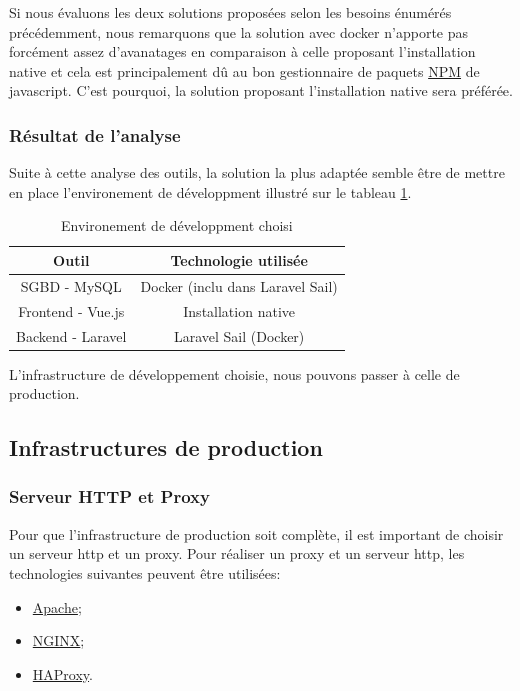 \documentclass[
    iai, %
    il, %
]{heig-tb}
\begin{document}
Si nous évaluons les deux solutions proposées selon les besoins énumérés précédemment, nous remarquons que  la solution avec \Gls{docker} n'apporte pas forcément assez d'avanatages en comparaison à celle proposant l'installation native et cela est principalement dû au bon gestionnaire de paquets \href{https://www.npmjs.com/}{NPM} de \Gls{javascript}. C'est pourquoi, la solution proposant l'installation native sera préférée.

\subsubsection{Résultat de l'analyse}
Suite à cette analyse des outils, la solution la plus adaptée semble être de mettre en place
l'environement de développment illustré sur le tableau \ref{env-dev}.

\begin{table}[h]
    \begin{center}
        \caption{Environement de développment choisi \label{env-dev}}
        \begin{tabular}{c|c}
            Outil             & Technologie utilisée             \\ \hline
            SGBD - MySQL      & Docker (inclu dans Laravel Sail) \\
            Frontend - Vue.js & Installation native              \\
            Backend - Laravel & Laravel Sail (Docker)            \\
        \end{tabular}
    \end{center}
\end{table}

L'infrastructure de développement choisie, nous pouvons passer à celle de production.

\clearpage
\subsection{Infrastructures de production}

\subsubsection{Serveur HTTP et Proxy}
Pour que l'infrastructure de production soit complète, il est important de choisir un serveur \Gls{http} et un \Gls{proxy}.
Pour réaliser un \Gls{proxy} et un serveur \Gls{http}, les technologies suivantes peuvent être utilisées:
\begin{itemize}
    \item \href{https://httpd.apache.org/}{Apache};
    \item \href{https://www.nginx.com/}{NGINX};
    \item \href{https://www.haproxy.org/}{HAProxy}.
\end{itemize}
\end{document}
